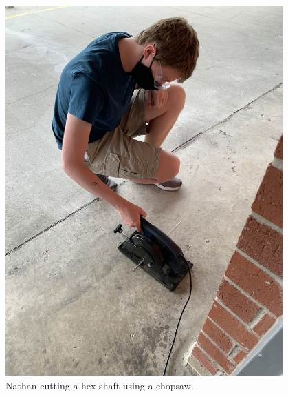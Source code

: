 \begin{figure}[htp]
\centering
  \includegraphics[width=0.95\textwidth]{Meetings/September/09-28-21/9-28-21_Hardware_Image5 - Nathan Forrer.jpg}
  \caption{Nathan cutting a hex shaft using a chopsaw.}
  \label{fig:pic5}
\end{figure}




